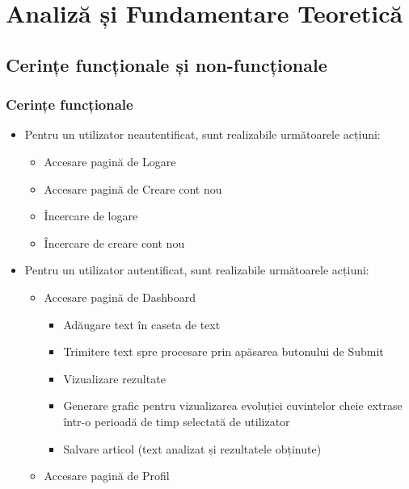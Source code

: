 \chapter{Analiză și Fundamentare Teoretică}
\label{ch:analysis}
\pagestyle{fancy}

\section{Cerințe funcționale și non-funcționale}
\subsection{Cerințe funcționale}
\begin{itemize}
    \setlength\itemsep{0.5em}
    \item Pentru un utilizator neautentificat, sunt realizabile următoarele acțiuni:
    \begin{itemize}
		\setlength\itemsep{0.5em}
        \item Accesare pagină de Logare
        \item Accesare pagină de Creare cont nou
        \item Încercare de logare
        \item Încercare de creare cont nou
    \end{itemize}
    \item Pentru un utilizator autentificat, sunt realizabile următoarele acțiuni:
    \begin{itemize}
		\setlength\itemsep{0.5em}
        \item Accesare pagină de Dashboard
        \begin{itemize}
            \setlength\itemsep{0.5em}
            \item Adăugare text în caseta de text
            \item Trimitere text spre procesare prin apăsarea butonului de Submit
            \item Vizualizare rezultate
            \item Generare grafic pentru vizualizarea evoluției cuvintelor cheie extrase într-o perioadă de timp selectată de utilizator
            \item Salvare articol (text analizat și rezultatele obținute)
        \end{itemize}
        \item Accesare pagină de Profil

\end{itemize}
\end{itemize}
